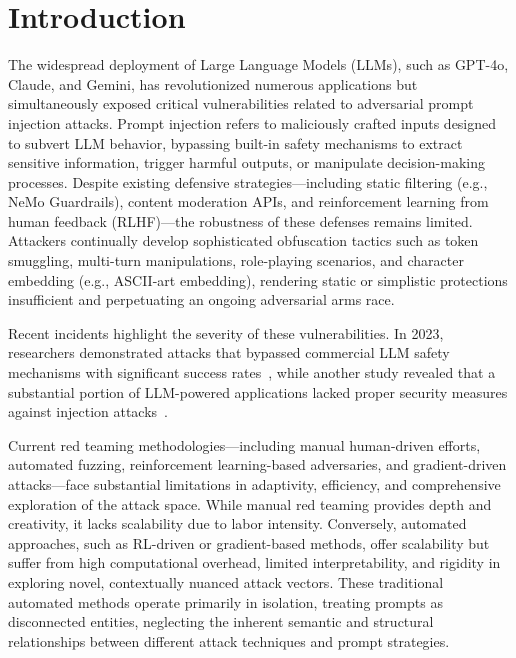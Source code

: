 \section{Introduction}

The widespread deployment of Large Language Models (LLMs), such as GPT-4o, Claude, and Gemini, has revolutionized numerous applications but simultaneously exposed critical vulnerabilities related to adversarial prompt injection attacks. Prompt injection refers to maliciously crafted inputs designed to subvert LLM behavior, bypassing built-in safety mechanisms to extract sensitive information, trigger harmful outputs, or manipulate decision-making processes. Despite existing defensive strategies—including static filtering (e.g., NeMo Guardrails\cite{nvidia2023nemo}), content moderation APIs, and reinforcement learning from human feedback (RLHF)—the robustness of these defenses remains limited. Attackers continually develop sophisticated obfuscation tactics such as token smuggling, multi-turn manipulations, role-playing scenarios, and character embedding (e.g., ASCII-art embedding), rendering static or simplistic protections insufficient and perpetuating an ongoing adversarial arms race.

Recent incidents highlight the severity of these vulnerabilities. In 2023, researchers demonstrated attacks that bypassed commercial LLM safety mechanisms with significant success rates~\cite{liu2023autodan}, while another study revealed that a substantial portion of LLM-powered applications lacked proper security measures against injection attacks~\cite{greshake2023youve}.

Current red teaming methodologies—including manual human-driven efforts, automated fuzzing\cite{yu2024llmfuzzer}, reinforcement learning-based adversaries, and gradient-driven attacks—face substantial limitations in adaptivity, efficiency, and comprehensive exploration of the attack space. While manual red teaming provides depth and creativity, it lacks scalability due to labor intensity. Conversely, automated approaches, such as RL-driven or gradient-based methods, offer scalability but suffer from high computational overhead, limited interpretability, and rigidity in exploring novel, contextually nuanced attack vectors. These traditional automated methods operate primarily in isolation, treating prompts as disconnected entities, neglecting the inherent semantic and structural relationships between different attack techniques and prompt strategies.

